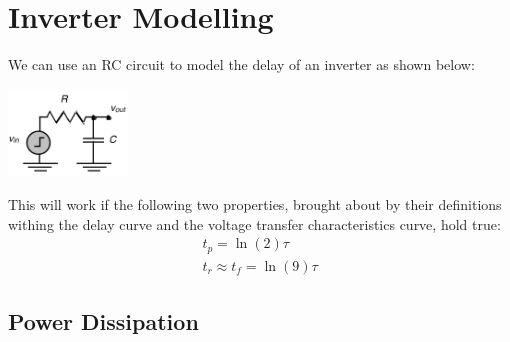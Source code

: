 \documentclass[nobib]{tufte-handout}
\begin{document}
\section{Inverter Modelling}
We can use an RC circuit to model the delay of an inverter as shown below:
\begin{center}
    \includegraphics*[width = 120px]{images/rc_inverter_delay.png}
\end{center}
This will work if the following two properties, brought about by their definitions withing the delay curve and the voltage transfer characteristics curve, hold true:
\begin{eqnarray*}
    t_p = \ln(2)\tau\\
    t_r \approx t_f = \ln(9)\tau
\end{eqnarray*}
\subsection{Power Dissipation}
\end{document}
